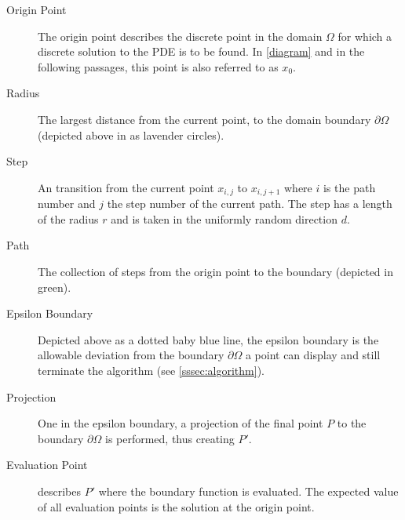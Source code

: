 \begin{description}
\item[Origin Point] The origin point describes the discrete point in the domain
$\Omega$ for which a discrete solution to the PDE is to be found. In \ref{diagram}
and in the following passages, this point is also referred to as $x_{0}$.
\item[Radius] The largest distance from the current point, to the domain boundary
$\partial\Omega$ (depicted above in as lavender circles).
\item[Step] An transition from the current point $x_{i,j}$ to $x_{i,j+1}$ where
$i$ is the path number and $j$ the step number of the current path.  The step has
a length of the radius $r$ and is taken in the uniformly random direction $d$.
\item[Path] The collection of steps from the origin point to the boundary (depicted in green).
\item[Epsilon Boundary] Depicted above as a dotted baby blue line, the epsilon boundary
is the allowable deviation from the boundary $\partial\Omega$ a point can display
and still terminate the algorithm (see \ref{sssec:algorithm}).
\item[Projection] One in the epsilon boundary, a projection of the final point $P$
to the boundary $\partial\Omega$ is performed, thus creating $P'$.
\item[Evaluation Point] describes $P'$ where the boundary function is evaluated.
The expected value of all evaluation points is the solution at the origin point.
\end{description}

